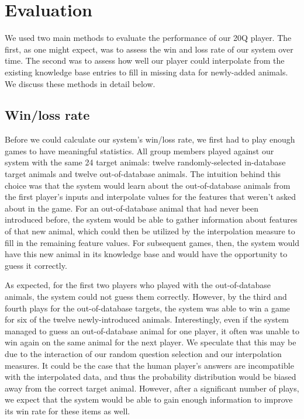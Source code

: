 \documentclass[11pt,a4paper]{article}
\begin{document}
\section{Evaluation}
\label{sec:eval}

We used two main methods to evaluate the performance of our 20Q player. The first, as one might expect, was to assess the win and loss rate of our system over time. The second was to assess how well our player could interpolate from the existing knowledge base entries to fill in missing data for newly-added animals. We discuss these methods in detail below.

\subsection{Win/loss rate}

Before we could calculate our system's win/loss rate, we first had to play enough games to have meaningful statistics. 
All group members played against our system with the same 24 target animals: twelve randomly-selected in-database target animals and twelve out-of-database animals. 
The intuition behind this choice was that the system would learn about the out-of-database animals from the first player's inputs and interpolate values for the features that weren't asked about in the game. 
For an out-of-database animal that had never been introduced before, the system would be able to gather information about features of that new animal, which could then be utilized by the interpolation measure to fill in the remaining feature values. 
For subsequent games, then, the system would have this new animal in its knowledge base and would have the opportunity to guess it correctly. 

As expected, for the first two players who played with the out-of-database animals, the system could not guess them correctly.
However, by the third and fourth plays for the out-of-database targets, the system was able to win a game for six of the twelve newly-introduced animals.
Interestingly, even if the system managed to guess an out-of-database animal for one player, it often was unable to win again on the same animal for the next player.
We speculate that this may be due to the interaction of our random question selection and our interpolation measures. 
It could be the case that the human player's answers are incompatible with the interpolated data, and thus the probability distribution would be biased away from the correct target animal. 
However, after a significant number of plays, we expect that the system would be able to gain enough information to improve its win rate for these items as well.
\end{document}
